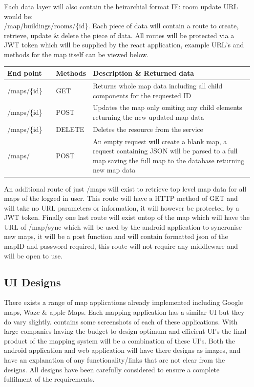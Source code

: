 Each data layer will also contain the heirarchial format IE: room update URL would be:\\ /map/buildings/rooms/\{id\}. Each piece of data will contain a route to create, retrieve, update \& delete the piece of data. All routes will be protected via a JWT token which will be supplied by the react application, example URL's and methods for the map itself can be viewed below.

\begin{longtable}{| p{0.2\linewidth} | p{0.1\linewidth} | p{0.7\linewidth}|}
	\hline
	End point & Methods & Description \& Returned data\\\hline
	/maps/\{id\} & GET & Returns whole map data including all child components for the requested ID\\\hline
	/maps/\{id\} & POST & Updates the map only omiting any child elements  returning the new updated map data\\\hline
	/maps/\{id\} & DELETE & Deletes the resource from the service\\\hline
	/maps/ & POST & An empty request will create a blank map, a request containing JSON will be parsed to a full map saving the full map to the database returning new map data\\\hline
	
\end{longtable}

An additional route of just /maps will exist to retrieve top level map data for all maps of the logged in user. This route will have a HTTP method of GET and will take no URL parameters or information, it will however be protected by a JWT token.
Finally one last route will exist ontop of the map which will have the URL of /map/sync which will be used by the android application to syncronise new maps, it will be a post function and will contain formatted json of the mapID and password required, this route will not require any middleware and will be open to use.

\subsection{UI Designs}
There exists a range of map applications already implemented including Google maps, Waze \& apple Maps. Each mapping application has a similar UI but they do vary slightly. \appendixtemp contains some screenshots of each of these applications. With large companies having the budget to design optimum and efficient UI's the final product of the mapping system will be a combination of these UI's. Both the android application and web application will have there designs as images, and have an explanation of any functionality/links that are not clear from the designs. All designs have been carefully considered to ensure a complete fulfilment of the requirements.

